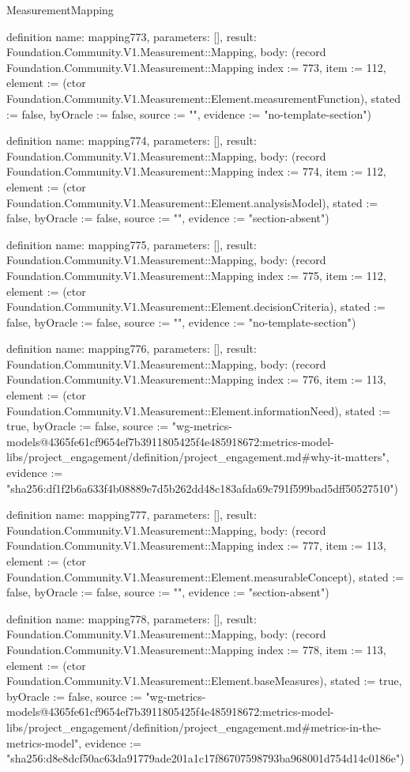 \begin{lexlean}{MeasurementMapping}
\begin{semanticmodule}
definition{
  name: mapping773,
  parameters: [],
  result: Foundation.Community.V1.Measurement::Mapping,
  body: (record Foundation.Community.V1.Measurement::Mapping {index := 773, item := 112, element := (ctor Foundation.Community.V1.Measurement::Element.measurementFunction), stated := false, byOracle := false, source := "", evidence := "no-template-section"})
}

definition{
  name: mapping774,
  parameters: [],
  result: Foundation.Community.V1.Measurement::Mapping,
  body: (record Foundation.Community.V1.Measurement::Mapping {index := 774, item := 112, element := (ctor Foundation.Community.V1.Measurement::Element.analysisModel), stated := false, byOracle := false, source := "", evidence := "section-absent"})
}

definition{
  name: mapping775,
  parameters: [],
  result: Foundation.Community.V1.Measurement::Mapping,
  body: (record Foundation.Community.V1.Measurement::Mapping {index := 775, item := 112, element := (ctor Foundation.Community.V1.Measurement::Element.decisionCriteria), stated := false, byOracle := false, source := "", evidence := "no-template-section"})
}

definition{
  name: mapping776,
  parameters: [],
  result: Foundation.Community.V1.Measurement::Mapping,
  body: (record Foundation.Community.V1.Measurement::Mapping {index := 776, item := 113, element := (ctor Foundation.Community.V1.Measurement::Element.informationNeed), stated := true, byOracle := false, source := "wg-metrics-models@4365fe61cf9654ef7b3911805425f4e485918672:metrics-model-libs/project_engagement/definition/project_engagement.md#why-it-matters", evidence := "sha256:df1f2b6a633f4b08889e7d5b262dd48c183afda69c791f599bad5dff50527510"})
}

definition{
  name: mapping777,
  parameters: [],
  result: Foundation.Community.V1.Measurement::Mapping,
  body: (record Foundation.Community.V1.Measurement::Mapping {index := 777, item := 113, element := (ctor Foundation.Community.V1.Measurement::Element.measurableConcept), stated := false, byOracle := false, source := "", evidence := "section-absent"})
}

definition{
  name: mapping778,
  parameters: [],
  result: Foundation.Community.V1.Measurement::Mapping,
  body: (record Foundation.Community.V1.Measurement::Mapping {index := 778, item := 113, element := (ctor Foundation.Community.V1.Measurement::Element.baseMeasures), stated := true, byOracle := false, source := "wg-metrics-models@4365fe61cf9654ef7b3911805425f4e485918672:metrics-model-libs/project_engagement/definition/project_engagement.md#metrics-in-the-metrics-model", evidence := "sha256:d8e8dcf50ac63da91779ade201a1c17f86707598793ba968001d754d14c0186e"})
}


\end{semanticmodule}
\end{lexlean}
